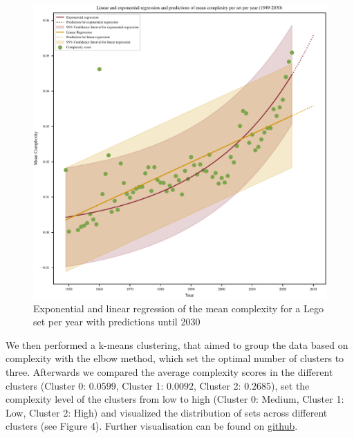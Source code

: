 \documentclass{article}
\theoremstyle{plain}
\theoremstyle{definition}
\theoremstyle{remark}
\begin{document}
\begin{figure}[ht]
 \vskip 0.2in
 \begin{center}
 \centerline{\includegraphics[width=\columnwidth]{Images/Regressions.pdf}}
\caption{Exponential and linear regression of the mean complexity for a Lego set per year with predictions until 2030}
\label{icml-historical}
 \end{center}
 \vskip -0.2in
\end{figure}

We then performed a k-means clustering, that aimed to group the data based on complexity with the elbow method, which set the optimal number of clusters to three. Afterwards we compared the average complexity scores in the different clusters (Cluster 0: $0.0599$, Cluster 1: $0.0092$, Cluster 2: $0.2685$), set the complexity level of the clusters from low to high (Cluster 0: Medium, Cluster 1: Low, Cluster 2: High) and visualized the distribution of sets across different clusters (see Figure 4). Further visualisation can be found on \href{https://github.com/eddiebeach99/Data_Literacy/blob/main/Analysis/clustering.ipynb}{github}.
\end{document}
